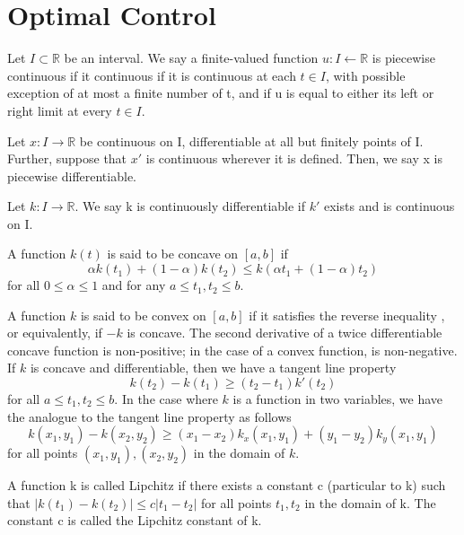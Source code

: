 \section{Optimal Control}\label{Chap1-Sect2}
	

\begin{definition}
	Let $I \subset \mathbb{R}$ be an interval. We say a finite-valued function
    $u : I \leftarrow \mathbb{R}$ is piecewise continuous if it continuous if it
    is continuous at each $t \in I$, with possible exception of at most a finite 
    number of t, and if u is equal to either its left or right limit at every
    $t \in I$.
\end{definition}

\begin{definition}
	Let $x : I \rightarrow \mathbb{R}$ be continuous on I, differentiable at all
    but finitely points of I. Further, suppose that $x'$ is continuous
    wherever it is defined. Then, we say x is piecewise differentiable.
\end{definition}

\begin{definition}
	Let $k : I \rightarrow \mathbb{R}$. We say k is continuously differentiable
    if $k' $ exists and is continuous on I.
\end{definition}

\begin{definition}
	A function $k(t)$ is said to be concave on $[a,b]$ if 
    $$
    	\alpha k(t_1) + (1-\alpha)k(t_2) \leq k(\alpha t_1 + (1-\alpha)t_2)
    $$
    for all $0 \leq \alpha \leq 1$ and for any $a \leq t_1,t_2 \leq b$.
\end{definition}

A function $k$ is said to be convex on $[a,b]$ if it satisfies the reverse 
inequality , or equivalently, if $-k$ is concave. The second derivative of a
twice differentiable concave function is non-positive; in the case of a convex
function, is non-negative. If $k$ is concave and differentiable, then we have 
a tangent line property
	$$
    	k(t_2) - k(t_1) \geq (t_2 - t_1)k'(t_2)
	$$
for all $a \leq t_1,t_2 \leq b$. 
In the case where $k$ is a function in two variables, we have the analogue to
the tangent line property as follows
	$$
    	k(x_1,y_1) - k(x_2,y_2) \geq (x_1 - x_2)k_x(x_1,y_1) + 
        (y_1 - y_2)k_y(x_1,y_1)
	$$
    for all points $(x_1,y_1),(x_2,y_2)$ in the domain of $k$.
\begin{definition}
	A function k is called Lipchitz if there exists a constant c (particular
    to k) such that $|k(t_1) - k(t_2)| \leq c|t_1 - t_2|$ for all points $t_1,
    t_2$ in the domain of k. The constant c is called the Lipchitz constant of 
    k.
\end{definition}

